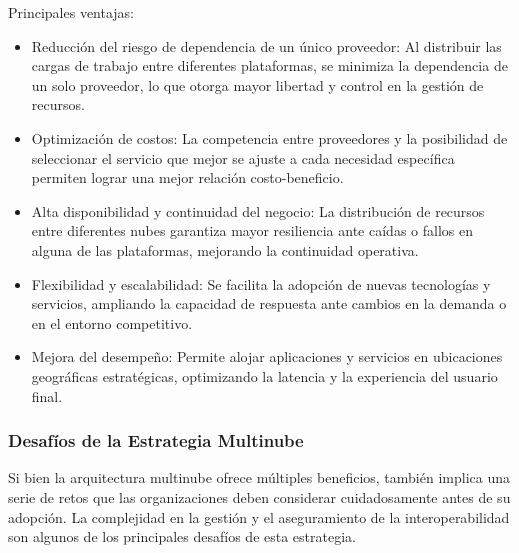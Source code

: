 {                Principales ventajas:
                \begin{itemize}
                    \item Reducci{\'o}n del riesgo de dependencia de un {\'u}nico proveedor: Al distribuir las cargas de trabajo entre diferentes plataformas, se minimiza la dependencia de un solo proveedor, lo que otorga mayor libertad y control en la gesti{\'o}n de recursos.
                    \item Optimizaci{\'o}n de costos: La competencia entre proveedores y la posibilidad de seleccionar el servicio que mejor se ajuste a cada necesidad espec{\'i}fica permiten lograr una mejor relaci{\'o}n costo-beneficio.
                    \item Alta disponibilidad y continuidad del negocio: La distribuci{\'o}n de recursos entre diferentes nubes garantiza mayor resiliencia ante ca{\'i}das o fallos en alguna de las plataformas, mejorando la continuidad operativa.
                    \item Flexibilidad y escalabilidad: Se facilita la adopci{\'o}n de nuevas tecnolog{\'i}as y servicios, ampliando la capacidad de respuesta ante cambios en la demanda o en el entorno competitivo.
                    \item Mejora del desempeño: Permite alojar aplicaciones y servicios en ubicaciones geogr{\'a}ficas estrat{\'e}gicas, optimizando la latencia y la experiencia del usuario final.
                \end{itemize}
            \subsubsection{Desaf{\'i}os de la Estrategia Multinube}
                Si bien la arquitectura multinube ofrece m{\'u}ltiples beneficios, tambi{\'e}n implica una serie de retos que las organizaciones deben considerar cuidadosamente antes de su adopci{\'o}n. La complejidad en la gesti{\'o}n y el aseguramiento de la interoperabilidad son algunos de los principales desaf{\'i}os de esta estrategia.

}
